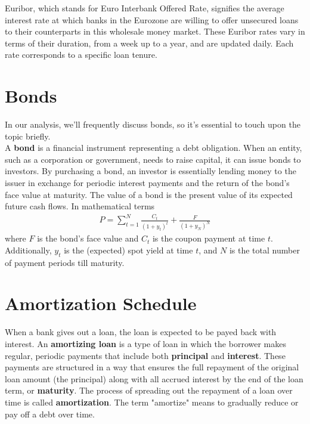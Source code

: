 \documentclass[11pt]{report}
\begin{document}
Euribor, which stands for Euro Interbank Offered Rate, signifies the average interest rate at which banks in the Eurozone are willing to offer unsecured loans to their counterparts in this wholesale money market. These Euribor rates vary in terms of their duration, from a week up to a year, and are updated daily. Each rate corresponds to a specific loan tenure.


\section{Bonds}

In our analysis, we'll frequently discuss bonds, so it's essential to touch upon the topic briefly.\\

A \textbf{bond} is a financial instrument representing a debt obligation. When an entity, such as a corporation or government, needs to raise capital, it can issue bonds to investors. By purchasing a bond, an investor is essentially lending money to the issuer in exchange for periodic interest payments and the return of the bond's face value at maturity. The value of a bond is the present value of its expected future cash flows. In mathematical terms
\begin{align}
	P=\sum_{t=1}^N\frac{C_t}{(1+y_t)^t}+\frac{F}{(1+y_N)^N}
\end{align}
where $F$ is the bond's face value and $C_t$ is the coupon payment at time $t$. Additionally, $y_t$ is the (expected) spot yield at time $t$, and $N$ is the total number of payment periods till maturity.




\section{Amortization Schedule}

When a bank gives out a loan, the loan is expected to be payed back with interest. An \textbf{amortizing loan} is a type of loan in which the borrower makes regular, periodic payments that include both \textbf{principal} and \textbf{interest}. These payments are structured in a way that ensures the full repayment of the original loan amount (the principal) along with all accrued interest by the end of the loan term, or \textbf{maturity}. The process of spreading out the repayment of a loan over time is called \textbf{amortization}. The term "amortize" means to gradually reduce or pay off a debt over time.\\
\end{document}
